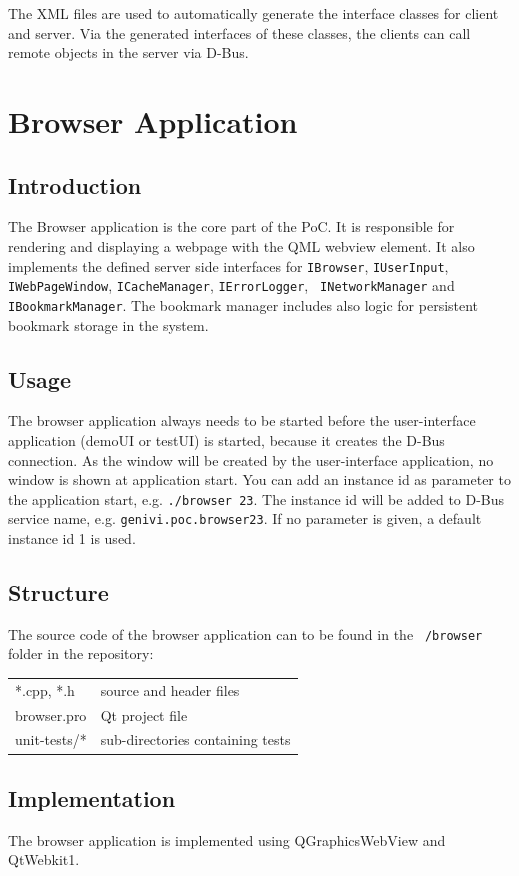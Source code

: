 \documentclass{pelagicore}
\begin{document}
The XML files are used to automatically generate the interface classes for
client and server. Via the generated interfaces of these classes, the clients
can call remote objects in the server via D-Bus.

\section{Browser Application}
\subsection{Introduction}
The Browser application is the core part of the PoC. It is responsible for
rendering and displaying a webpage with the QML webview element. It also
implements the defined server side interfaces for \texttt{IBrowser}, {\tt IUserInput},
{\tt IWebPageWindow}, {\tt ICacheManager}, {\tt IErrorLogger}, {\tt
INetworkManager} and {\tt IBookmarkManager}. The bookmark manager includes also
logic for persistent bookmark storage in the system.

\subsection{Usage}
The browser application always needs to be started before the user-interface
application (demoUI or testUI) is started, because it creates the D-Bus
connection. As the window will be created by the user-interface application, no
window is shown at application start.  You can add an instance id as parameter
to the application start, e.g. {\tt ./browser 23}. The instance id will be
added to D-Bus service name, e.g. {\tt genivi.poc.browser23}. If no parameter
is given, a default instance id 1 is used.

\subsection{Structure}
The source code of the browser application can to be found in the {\tt
/browser} folder in the repository:

\begin{tabular}{l l}
    *.cpp, *.h         & source and header files \\
    browser.pro        & Qt project file \\
    unit-tests/*       & sub-directories containing tests \\
\end{tabular}

\subsection{Implementation}
The browser application is implemented using QGraphicsWebView and QtWebkit1.
\end{document}
